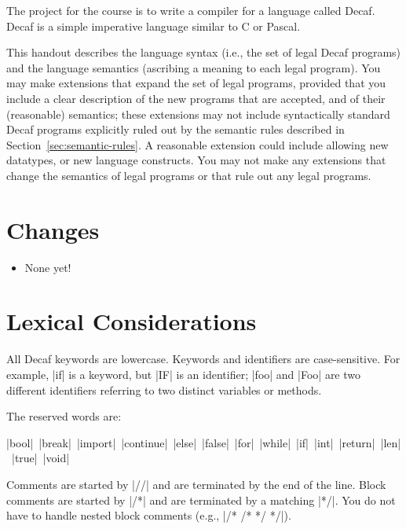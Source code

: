 \documentclass[11pt]{article}
\begin{document}


The project for the course is to write a compiler for a language called Decaf.
Decaf is a simple imperative language similar to C or Pascal.

This handout describes the language syntax (i.e., the set of legal Decaf programs) and the language semantics (ascribing a meaning to each legal program).
You may make extensions that expand the set of legal programs, provided that you include a clear description of the new programs that are accepted, and of their (reasonable) semantics; these extensions may not include syntactically standard Decaf programs explicitly ruled out by the semantic rules described in Section~\ref{sec:semantic-rules}.
A reasonable extension could include allowing new datatypes, or new language constructs.
You may not make any extensions that change the semantics of legal programs or that rule out any legal programs.

\section{Changes}

\begin{itemize}
\item None yet!
\end{itemize}

\section{Lexical Considerations}

All Decaf keywords are lowercase.
Keywords and identifiers are case-sensitive.
For example, \decaf|if| is a keyword, but \decaf|IF| is an identifier; \decaf|foo| and \decaf|Foo| are two different identifiers referring to two distinct variables or methods.

The reserved words are:

\decaf|bool|~\decaf|break|~\decaf|import|~\decaf|continue|~\decaf|else|~\decaf|false|~\decaf|for|~\decaf|while|~\decaf|if|~\decaf|int|~\decaf|return|~\decaf|len|~\decaf|true|~\decaf|void|

Comments are started by \decaf|//| and are terminated by the end of the line.
Block comments are started by \decaf|/*| and are terminated by a matching \decaf[basicstyle=\ttfamily\color{decafGrey}]|*/|.
You do not have to handle nested block comments (e.g., \decaf[basicstyle=\ttfamily\color{decafGrey}]|/* /* */ */|).
\end{document}
